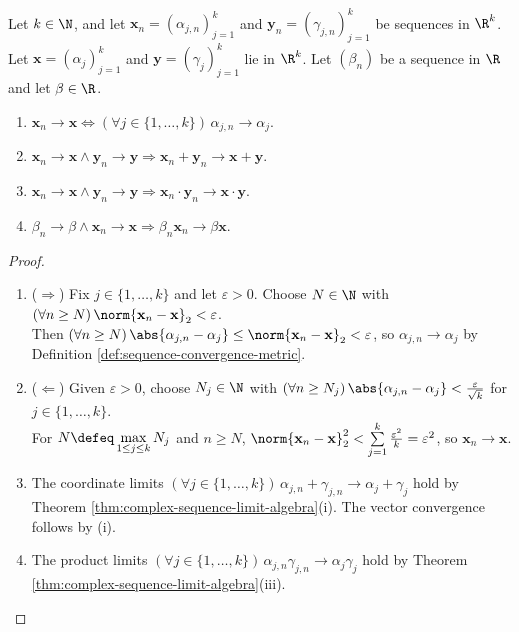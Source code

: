 \begin{theorem} \label{thm:rk-sequence-coordinate-convergence} \\
Let $k\in\N$, and let $\mathbf{x}_n=(\alpha_{j,n})_{j=1}^k$ and $\mathbf{y}_n=(\gamma_{j,n})_{j=1}^k$ be sequences in $\R^k$.\\
Let $\mathbf{x}=(\alpha_j)_{j=1}^k$ and $\mathbf{y}=(\gamma_j)_{j=1}^k$ lie in $\R^k$. Let $(\beta_n)$ be a sequence in $\R$ and let $\beta\in\R$.
\begin{enumerate}[label=(\roman*)]
\setlength{\itemsep}{0pt}
\item $\mathbf{x}_n\to\mathbf{x}\Longleftrightarrow(\forall j\in\{1,\ldots,k\})\, \alpha_{j,n}\to\alpha_j$.
\item $\mathbf{x}_n\to\mathbf{x}\land\mathbf{y}_n\to\mathbf{y} \Longrightarrow\mathbf{x}_n+\mathbf{y}_n\to\mathbf{x}+\mathbf{y}$.
\item $\mathbf{x}_n\to\mathbf{x}\land\mathbf{y}_n\to\mathbf{y} \Longrightarrow\mathbf{x}_n\cdot\mathbf{y}_n\to\mathbf{x}\cdot\mathbf{y}$.
\item $\beta_n\to\beta\land\mathbf{x}_n\to\mathbf{x} \Longrightarrow\beta_n\mathbf{x}_n\to\beta\mathbf{x}$.
\end{enumerate}
\begin{proof}
\begin{enumerate}[label=(\roman*)]
\setlength{\itemsep}{0pt}
\item[$(i)$] ($\Rightarrow$) Fix $j\in\{1,\ldots,k\}$ and let $\varepsilon>0$. Choose $N\in\N$ with $(\forall n\geq N)\,\norm{\mathbf{x}_n-\mathbf{x}}_2<\varepsilon$.\\
Then $(\forall n\geq N)\,\abs{\alpha_{j,n}-\alpha_j}\leq\norm{\mathbf{x}_n-\mathbf{x}}_2<\varepsilon$, so $\alpha_{j,n}\to\alpha_j$ by Definition \ref{def:sequence-convergence-metric}.
\item[$(i)$] ($\Leftarrow$) Given $\varepsilon>0$, choose $N_j\in\N$ with $(\forall n\geq N_j)\,\abs{\alpha_{j,n}-\alpha_j}<\frac{\varepsilon}{\sqrt{k}}$ for $j\in\{1,\ldots,k\}$.\\
For $N\defeq\max\limits_{1\leq j\leq k}N_j$ and $n\geq N$, $\norm{\mathbf{x}_n-\mathbf{x}}_2^2< \sum\limits_{j=1}^{k}\frac{\varepsilon^2}{k}=\varepsilon^2$, so $\mathbf{x}_n\to\mathbf{x}$.
\item[$(ii)$] The coordinate limits $(\forall j\in\{1,\ldots,k\})\,\alpha_{j,n}+\gamma_{j,n}\to\alpha_j+\gamma_j$ hold by Theorem \ref{thm:complex-sequence-limit-algebra}(i). The vector convergence follows by (i).
\item[$(iii)$] The product limits $(\forall j\in\{1,\ldots,k\})\,\alpha_{j,n}\gamma_{j,n}\to\alpha_j\gamma_j$ hold by Theorem \ref{thm:complex-sequence-limit-algebra}(iii).\\

\end{enumerate}
\end{proof}
\end{theorem}
